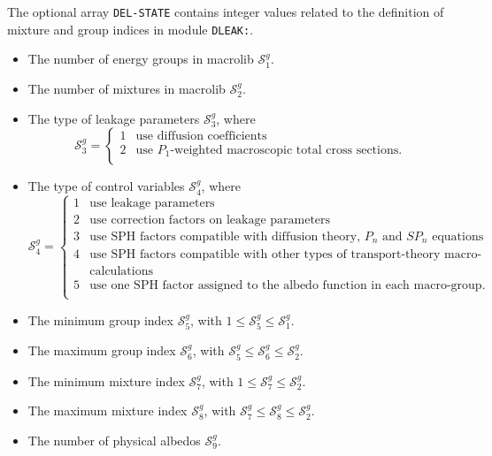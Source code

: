 The optional array {\tt DEL-STATE} contains integer values related to the definition of mixture and group indices in module {\tt DLEAK:}.
\begin{itemize}
\item The number of energy groups in macrolib $\mathcal{S}^{g}_{1}$.
\item The number of mixtures in macrolib $\mathcal{S}^{g}_{2}$.
\item The type of leakage parameters $\mathcal{S}^{g}_{3}$,
where
\begin{displaymath}
\mathcal{S}^{g}_{3} = \left\{
\begin{array}{rl}
1 & \textrm{use diffusion coefficients} \\
2 & \textrm{use $P_1$-weighted macroscopic total cross sections.} \\
\end{array} \right.
\end{displaymath}

\item The type of control variables $\mathcal{S}^{g}_{4}$,
where
\begin{displaymath}
\mathcal{S}^{g}_{4} = \left\{
\begin{array}{rl}
1 & \textrm{use leakage parameters} \\
2 & \textrm{use correction factors on leakage parameters} \\
3 & \textrm{use SPH factors compatible with diffusion theory, $P_n$ and $SP_n$ equations} \\
4 & \textrm{use SPH factors compatible with other types of transport-theory macro-} \\
& \textrm{calculations} \\
5 & \textrm{use one SPH factor assigned to the albedo function in each macro-group.} \\
\end{array} \right.
\end{displaymath}

\item The minimum group index $\mathcal{S}^{g}_{5}$, with $1 \le \mathcal{S}^{g}_{5}\le \mathcal{S}^{g}_{1}$.
\item The maximum group index $\mathcal{S}^{g}_{6}$, with $\mathcal{S}^{g}_{5} \le \mathcal{S}^{g}_{6}\le \mathcal{S}^{g}_{2}$.
\item The minimum mixture index $\mathcal{S}^{g}_{7}$, with $1 \le \mathcal{S}^{g}_{7}\le \mathcal{S}^{g}_{2}$.
\item The maximum mixture index $\mathcal{S}^{g}_{8}$, with $\mathcal{S}^{g}_{7} \le \mathcal{S}^{g}_{8}\le \mathcal{S}^{g}_{2}$.
\item The number of physical albedos $\mathcal{S}^{g}_{9}$.

\end{itemize}
\goodbreak

